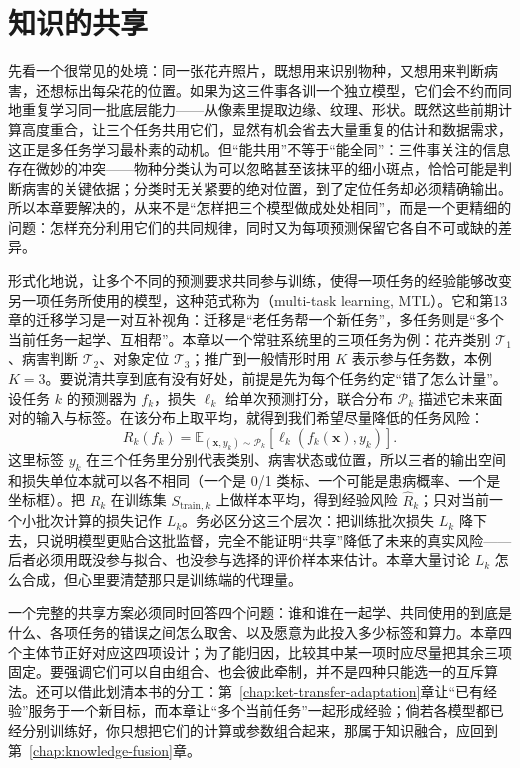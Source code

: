 \chapter{知识的共享}
\label{chap:ket-sharing}

先看一个很常见的处境：同一张花卉照片，既想用来识别物种，又想用来判断病害，还想标出每朵花的位置。如果为这三件事各训一个独立模型，它们会不约而同地重复学习同一批底层能力——从像素里提取边缘、纹理、形状。既然这些前期计算高度重合，让三个任务共用它们，显然有机会省去大量重复的估计和数据需求，这正是多任务学习最朴素的动机。但“能共用”不等于“能全同”：三件事关注的信息存在微妙的冲突——物种分类认为可以忽略甚至该抹平的细小斑点，恰恰可能是判断病害的关键依据；分类时无关紧要的绝对位置，到了定位任务却必须精确输出。所以本章要解决的，从来不是“怎样把三个模型做成处处相同”，而是一个更精细的问题：怎样充分利用它们的共同规律，同时又为每项预测保留它各自不可或缺的差异。

形式化地说，让多个不同的预测要求共同参与训练，使得一项任务的经验能够改变另一项任务所使用的模型，这种范式称为（multi-task learning, MTL）。它和第13章的迁移学习是一对互补视角：迁移是“老任务帮一个新任务”，多任务则是“多个当前任务一起学、互相帮”。本章以一个常驻系统里的三项任务为例：花卉类别 $\mathcal T_1$、病害判断 $\mathcal T_2$、对象定位 $\mathcal T_3$；推广到一般情形时用 $K$ 表示参与任务数，本例 $K=3$。要说清共享到底有没有好处，前提是先为每个任务约定“错了怎么计量”。设任务 $k$ 的预测器为 $f_k$，损失 $\ell_k$ 给单次预测打分，联合分布 $\mathcal P_k$ 描述它未来面对的输入与标签。在该分布上取平均，就得到我们希望尽量降低的任务风险：
\begin{equation}
  R_k(f_k)=
  \mathbb E_{(\bm{x},y_k)\sim\mathcal P_k}
  [\ell_k(f_k(\bm{x}),y_k)].
  \label{eq:ket-sharing-task-risk}
\end{equation}
这里标签 $y_k$ 在三个任务里分别代表类别、病害状态或位置，所以三者的输出空间和损失单位本就可以各不相同（一个是 0/1 类标、一个可能是患病概率、一个是坐标框）。把 $R_k$ 在训练集 $S_{\mathrm{train},k}$ 上做样本平均，得到经验风险 $\hat R_k$；只对当前一个小批次计算的损失记作 $L_k$。务必区分这三个层次：把训练批次损失 $L_k$ 降下去，只说明模型更贴合这批监督，完全不能证明“共享”降低了未来的真实风险——后者必须用既没参与拟合、也没参与选择的评价样本来估计。本章大量讨论 $L_k$ 怎么合成，但心里要清楚那只是训练端的代理量。

一个完整的共享方案必须同时回答四个问题：谁和谁在一起学、共同使用的到底是什么、各项任务的错误之间怎么取舍、以及愿意为此投入多少标签和算力。本章四个主体节正好对应这四项设计；为了能归因，比较其中某一项时应尽量把其余三项固定。要强调它们可以自由组合、也会彼此牵制，并不是四种只能选一的互斥算法。还可以借此划清本书的分工：第~\ref{chap:ket-transfer-adaptation}章让“已有经验”服务于一个新目标，而本章让“多个当前任务”一起形成经验；倘若各模型都已经分别训练好，你只想把它们的计算或参数组合起来，那属于知识融合，应回到第~\ref{chap:knowledge-fusion}章。


